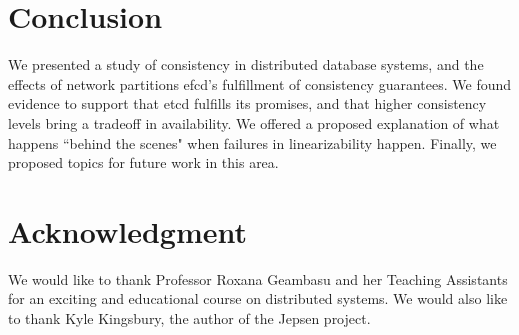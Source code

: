 \documentclass[12pt,conference]{IEEEtran}
\begin{document}



\section{Conclusion}

We presented a study of consistency in distributed database systems, and the effects of network partitions efcd's fulfillment of consistency guarantees. We found evidence to support that etcd fulfills its promises, and that higher consistency levels bring a tradeoff in availability. We offered a proposed explanation of what happens ``behind the scenes" when failures in linearizability happen. Finally, we proposed topics for future work in this area.





\section*{Acknowledgment}

We would like to thank Professor Roxana Geambasu and her Teaching Assistants for an exciting and educational course on distributed systems. We would also like to thank Kyle Kingsbury, the author of the Jepsen project.






\end{document}
